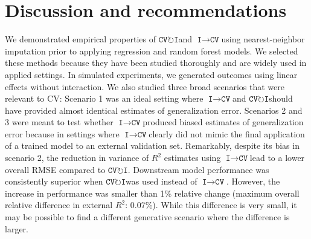 \documentclass[AMA,STIX1COL,doublespace]{WileyNJD-v2}
\begin{document}
\section{Discussion and recommendations} \label{sec:discuss}

We demonstrated empirical properties of
$\texttt{CV}\!\circlearrowright\!\texttt{I}$\space and
$\texttt{I}\!\!\rightarrow\!\texttt{CV}$\space using nearest-neighbor
imputation prior to applying regression and random forest models. We
selected these methods because they have been studied thoroughly and are
widely used in applied settings. In simulated experiments, we generated
outcomes using linear effects without interaction. We also studied three
broad scenarios that were relevant to CV: Scenario 1 was an ideal
setting where $\texttt{I}\!\!\rightarrow\!\texttt{CV}$\space and
$\texttt{CV}\!\circlearrowright\!\texttt{I}$\space should have provided
almost identical estimates of generalization error. Scenarios 2 and 3
were meant to test whether
$\texttt{I}\!\!\rightarrow\!\texttt{CV}$\space produced biased estimates
of generalization error because in settings where
$\texttt{I}\!\!\rightarrow\!\texttt{CV}$\space clearly did not mimic the
final application of a trained model to an external validation set.
Remarkably, despite its bias in scenario 2, the reduction in variance of
\(R^2\) estimates using
$\texttt{I}\!\!\rightarrow\!\texttt{CV}$\space lead to a lower overall
RMSE compared to $\texttt{CV}\!\circlearrowright\!\texttt{I}$.
Downstream model performance was consistently superior when
$\texttt{CV}\!\circlearrowright\!\texttt{I}$\space was used instead of
$\texttt{I}\!\!\rightarrow\!\texttt{CV}$. However, the increase in
performance was smaller than 1\% relative change (maximum overall
relative difference in external \(R^2\): 0.07\%). While this difference
is very small, it may be possible to find a different generative
scenario where the difference is larger.
\end{document}
